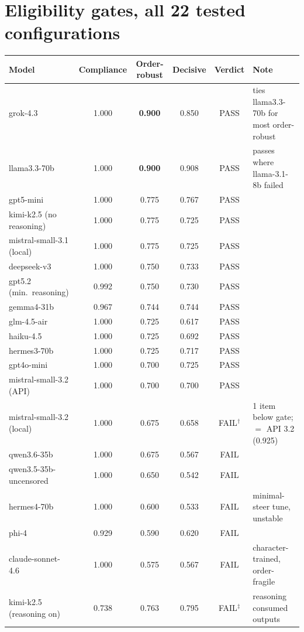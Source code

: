 \documentclass[11pt]{article}
\begin{document}
\section{Eligibility gates, all 22 tested configurations}\label{app:gates}
\begin{table}[H]
\centering\scriptsize\setlength{\tabcolsep}{4pt}
\begin{tabular}{lccccl}
\toprule
Model & Compliance & Order-robust & Decisive & Verdict & Note \\
\midrule
grok-4.3         & 1.000 & \textbf{0.900} & 0.850 & PASS & ties llama3.3-70b for most order-robust \\
llama3.3-70b     & 1.000 & \textbf{0.900} & 0.908 & PASS & passes where llama-3.1-8b failed \\
gpt5-mini        & 1.000 & 0.775 & 0.767 & PASS & \\
kimi-k2.5 (no reasoning) & 1.000 & 0.775 & 0.725 & PASS & \\
mistral-small-3.1 (local) & 1.000 & 0.775 & 0.725 & PASS & \\
deepseek-v3      & 1.000 & 0.750 & 0.733 & PASS & \\
gpt5.2 (min.\ reasoning) & 0.992 & 0.750 & 0.730 & PASS & \\
gemma4-31b       & 0.967 & 0.744 & 0.744 & PASS & \\
glm-4.5-air      & 1.000 & 0.725 & 0.617 & PASS & \\
haiku-4.5        & 1.000 & 0.725 & 0.692 & PASS & \\
hermes3-70b      & 1.000 & 0.725 & 0.717 & PASS & \\
gpt4o-mini       & 1.000 & 0.700 & 0.725 & PASS & \\
mistral-small-3.2 (API) & 1.000 & 0.700 & 0.700 & PASS & \\
mistral-small-3.2 (local) & 1.000 & 0.675 & 0.658 & FAIL$^\dagger$ & 1 item below gate; $=$ API 3.2 (0.925) \\
qwen3.6-35b      & 1.000 & 0.675 & 0.567 & FAIL & \\
qwen3.5-35b-uncensored & 1.000 & 0.650 & 0.542 & FAIL & \\
hermes4-70b      & 1.000 & 0.600 & 0.533 & FAIL & minimal-steer tune, unstable \\
phi-4            & 0.929 & 0.590 & 0.620 & FAIL & \\
claude-sonnet-4.6 & 1.000 & 0.575 & 0.567 & FAIL & character-trained, order-fragile \\
kimi-k2.5 (reasoning on) & 0.738 & 0.763 & 0.795 & FAIL$^\ddagger$ & reasoning consumed outputs \\

\end{tabular}
\end{table}
\end{document}
